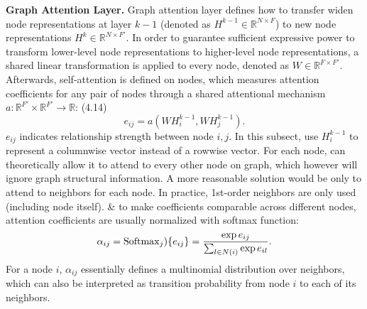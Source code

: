 \documentclass{article}
\begin{document}
\begin{itemize}
\begin{itemize}
\begin{itemize}
            {\bf Graph Attention Layer.} Graph attention layer defines how to transfer widen node representations at layer $k - 1$ (denoted as $H^{k-1}\in\mathbb{R}^{N\times F}$) to new node representations $H^k\in\mathbb{R}^{N\times F'}$. In order to guarantee sufficient expressive power to transform lower-level node representations to higher-level node representations, a shared linear transformation is applied to every node, denoted as $W\in\mathbb{R}^{F\times F'}$. Afterwards, self-attention is defined on nodes, which measures attention coefficients for any pair of nodes through a shared attentional mechanism $a:\mathbb{R}^{F'}\times\mathbb{R}^{F'}\to\mathbb{R}$: (4.14)
            \begin{equation*}
                e_{ij} = a(WH_i^{k-1},WH_j^{k-1}).
            \end{equation*}
            $e_{ij}$ indicates relationship strength between node $i,j$. In this subsect, use $H_i^{k-1}$ to represent a columnwise vector instead of a rowwise vector. For each node, can theoretically allow it to attend to every other node on graph, which however will ignore graph structural information. A more reasonable solution would be only to attend to neighbors for each node. In practice, 1st-order neighbors are only used (including node itself). \& to make coefficients comparable across different nodes, attention coefficients are usually normalized with softmax function:
            \begin{equation*}
                \alpha_{ij} = {\rm Softmax}_j)\{e_{ij}\} = \frac{\exp e_{ij}}{\sum_{l\in N(i)} \exp e_{il}}.
            \end{equation*}
            For a node $i$, $\alpha_{ij}$ essentially defines a multinomial distribution over neighbors, which can also be interpreted as transition probability from node $i$ to each of its neighbors.


\end{itemize}
\end{itemize}
\end{itemize}
\end{document}
